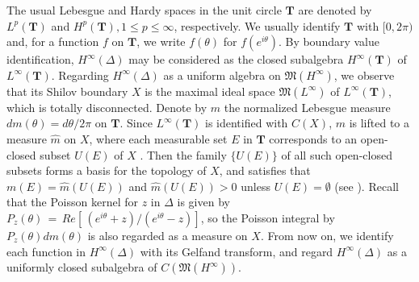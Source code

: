 \documentclass[12pt]{amsart}
\theoremstyle{plain}
\numberwithin{equation}{section}
\begin{document}
The usual Lebesgue and Hardy spaces in the unit circle $\mathbf{T}$ are
denoted by $L^p(\mathbf{T})$ and $H^p(\mathbf{T}), 1\le p\le \infty$, respectively.
We usually identify $\mathbf{T}$ with $[0,2\pi)$ and, for a function
$f$ on $\mathbf{T}$, we write $f(\theta)$ for $f(e^{i\theta})$.
By boundary value identification, $H^\infty(\Delta)$ may be considered as
the closed subalgebra $H^\infty(\mathbf{T})$ of $L^\infty(\mathbf{T})$.
Regarding $H^\infty(\Delta)$ as a uniform
algebra on $\mathfrak{M}(H^\infty)$, we observe that its Shilov boundary $X$
is the maximal ideal space $\mathfrak{M}(L^\infty)$ of
$L^\infty(\mathbf{T})$, which is totally disconnected.
Denote by $m$ the normalized Lebesgue measure
$dm(\theta) = d\theta /2\pi$ on $\mathbf{T}$. Since
$L^\infty(\mathbf{T})$ is identified with $C(X)$, $m$ is lifted to
a measure $\widehat{m}$ on $X$, where each measurable set
$E$ in $\mathbf{T}$ corresponds to an open-closed
subset $U(E)$ of $X$ . Then the family $\{U(E)\}$ of all such
open-closed subsets forms a basis for the topology of $X$, and
satisfies that $m(E)=\widehat{m}(U(E))$ and $\widehat{m}(U(E))>0$
unless $U(E) = \emptyset$
(see \cite[Chapter I]{G1}). Recall that the Poisson kernel
for $z$ in $\Delta$ is given by
$P_z(\theta)\,=\,Re [\,(e^{i\theta}+z)/(e^{i\theta}-z)]$,
so the Poisson integral by $P_z(\theta)dm(\theta)$ is also
regarded as a measure on $X$.
From now on, we identify
each function in $H^\infty(\Delta)$ with its Gelfand transform,
and regard $H^\infty(\Delta)$ as a uniformly closed
subalgebra of $C(\mathfrak{M}(H^\infty))$.
\end{document}
